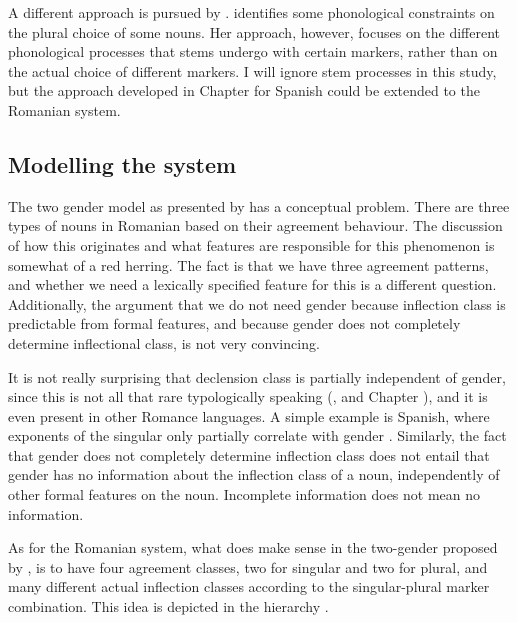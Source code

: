 A different approach is pursued by \textcite{Steriade.2008}. \citeauthor{Steriade.2008} identifies some phonological constraints on the plural choice of some nouns. Her approach, however, focuses on the different phonological processes that stems undergo with certain markers, rather than on the actual choice of different markers. I will ignore stem processes in this study, but the approach developed in Chapter  for Spanish could be extended to the Romanian system.

\subsection{Modelling the system}

The two gender model as presented by \textcite{Bateman.2010} has a conceptual problem. There are three types of nouns in Romanian based on their agreement behaviour. The discussion of how this originates and what features are responsible for this phenomenon is somewhat of a red herring. The fact is that we have three agreement patterns, and whether we need a lexically specified feature for this is a different question. Additionally, the argument that we do not need gender because inflection class is predictable from formal features, and because gender does not completely determine inflectional class, is not very convincing.

It is not really surprising that declension class is partially independent of gender, since this is not all that rare typologically speaking (\cite{Corbett.1991}, and Chapter ), and it is even present in other Romance languages. A simple example is Spanish, where exponents of the singular only partially correlate with gender \autocite{Harris.1991}. Similarly, the fact that gender does not completely determine inflection class does not entail that gender has no information about the inflection class of a noun, independently of other formal features on the noun. Incomplete information does not mean no information.

As for the Romanian system, what does make sense in the two-gender proposed by \textcite{Bateman.2010}, is to have four agreement classes, two for singular and two for plural, and many different actual inflection classes according to the singular-plural marker combination. This idea is depicted in the hierarchy .

